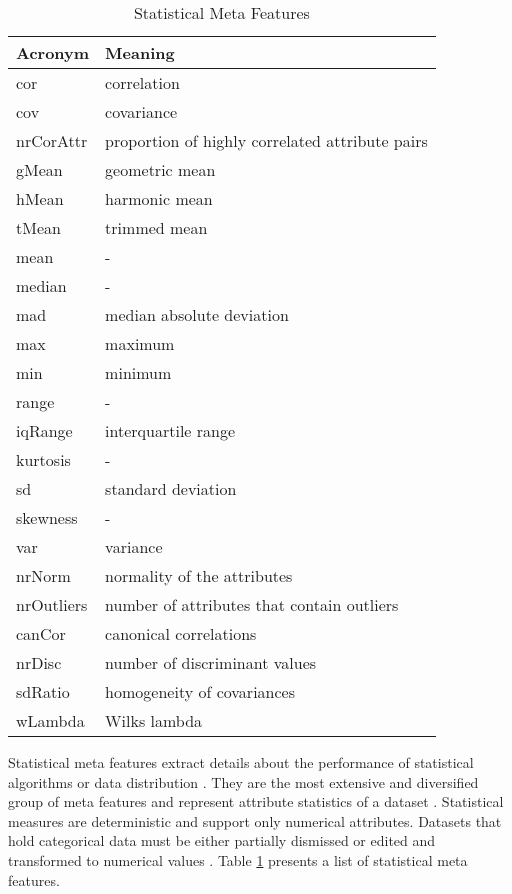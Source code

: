 \begin{table}[h!]
\centering
\caption{Statistical Meta Features}
\setlength{\tabcolsep}{8pt}
	\renewcommand{\arraystretch}{1.2}
    \begin{tabular}{ll}
    \hline
    Acronym & Meaning \\ \hline
    cor & correlation \\
    cov & covariance \\
    nrCorAttr & proportion of highly correlated attribute pairs \\
    gMean & geometric mean \\
    hMean & harmonic mean \\
    tMean &  trimmed mean \\
    mean & - \\
    median & - \\
    mad & median absolute deviation \\
    max & maximum \\
    min & minimum \\
    range & - \\
    iqRange & interquartile range \\
    kurtosis & - \\
    sd & standard deviation \\
    skewness & - \\ 
    var & variance\\
    nrNorm & normality of the attributes \\
    nrOutliers & number of attributes that contain outliers \\
    canCor & canonical correlations\\
    nrDisc & number of discriminant values\\
    sdRatio & homogeneity of covariances\\
    wLambda & Wilks lambda\\
    \hline
    \end{tabular}
\label{tab:stat-mf}
\end{table}

Statistical meta features extract details about the performance of statistical algorithms or data distribution \citep{michie1994machine}. They are the most extensive and diversified group of meta features and represent attribute statistics of a dataset \citep{bilalli2017predictive}. Statistical measures are deterministic and support only numerical attributes. Datasets that hold categorical data must be either partially dismissed or edited and transformed to numerical values \citep{rivolli2022meta}. Table \ref{tab:stat-mf} presents a list of statistical meta features.

